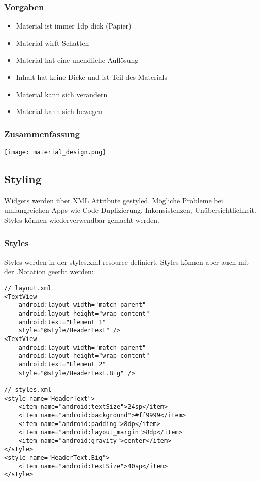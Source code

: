 \subsubsection{Vorgaben}
\begin{itemize}[topsep=0pt, leftmargin=4mm]
    \setlength\itemsep{-0.3em}
    \item Material ist immer 1dp dick (\dq Papier\dq)
    \item Material wirft Schatten
    \item Material hat eine unendliche Auflösung
    \item Inhalt hat keine Dicke und ist Teil des Materials
    \item Material kann sich verändern
    \item Material kann sich bewegen
\end{itemize}
\subsubsection{Zusammenfassung}
\texttt{[image: material\_design.png]}
\subsection{Styling}
Widgets werden über XML Attribute gestyled. Mögliche Probleme bei umfangreichen Apps wie Code-Duplizierung, Inkonsistenzen, Unübersichtlichkeit. Styles können wiederverwendbar gemacht werden.
\subsubsection{Styles}
Styles werden in der styles.xml resource definiert. Styles können aber auch mit der .Notation geerbt werden:
\begin{lstlisting}
// layout.xml
<TextView
    android:layout_width="match_parent"
    android:layout_height="wrap_content"
    android:text="Element 1"
    style="@style/HeaderText" />
<TextView
    android:layout_width="match_parent"
    android:layout_height="wrap_content"
    android:text="Element 2"
    style="@style/HeaderText.Big" />

// styles.xml
<style name="HeaderText">
    <item name="android:textSize">24sp</item>
    <item name="android:background">#ff9999</item>
    <item name="android:padding">8dp</item>
    <item name="android:layout_margin">8dp</item>
    <item name="android:gravity">center</item>
</style>
<style name="HeaderText.Big">
    <item name="android:textSize">40sp</item>
</style>
\end{lstlisting}
